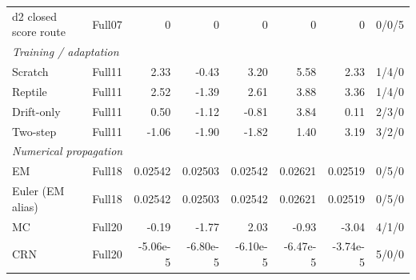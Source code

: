 \begin{longtable}{@{}p{.22\linewidth}p{.07\linewidth}rrrrrr@{}}
d2 closed score route & Full07 & 0 & 0 & 0 & 0 & 0 & 0/0/5\\
\multicolumn{8}{l}{\textit{Training / adaptation}}\\
Scratch & Full11 & 2.33 & -0.43 & 3.20 & 5.58 & 2.33 & 1/4/0\\
Reptile & Full11 & 2.52 & -1.39 & 2.61 & 3.88 & 3.36 & 1/4/0\\
Drift-only & Full11 & 0.50 & -1.12 & -0.81 & 3.84 & 0.11 & 2/3/0\\
Two-step & Full11 & -1.06 & -1.90 & -1.82 & 1.40 & 3.19 & 3/2/0\\
\multicolumn{8}{l}{\textit{Numerical propagation}}\\
EM & Full18 & 0.02542 & 0.02503 & 0.02542 & 0.02621 & 0.02519 & 0/5/0\\
Euler (EM alias) & Full18 & 0.02542 & 0.02503 & 0.02542 & 0.02621 & 0.02519 & 0/5/0\\
MC & Full20 & -0.19 & -1.77 & 2.03 & -0.93 & -3.04 & 4/1/0\\
CRN & Full20 & -5.06e-5 & -6.80e-5 & -6.10e-5 & -6.47e-5 & -3.74e-5 & 5/0/0\\
\end{longtable}
\endgroup
